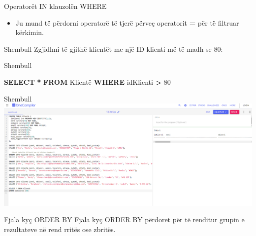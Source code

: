 \documentclass[
  ignorenonframetext,
]{beamer}
\newenvironment{Shaded}{\begin{snugshade}}{\end{snugshade}}
\newcommand{\DecValTok}[1]{\textcolor[rgb]{0.00,0.00,0.81}{#1}}
\newcommand{\KeywordTok}[1]{\textcolor[rgb]{0.13,0.29,0.53}{\textbf{#1}}}
\newcommand{\NormalTok}[1]{#1}
\newcommand{\OperatorTok}[1]{\textcolor[rgb]{0.81,0.36,0.00}{\textbf{#1}}}
\providecommand{\tightlist}{%
  \setlength{\itemsep}{0pt}\setlength{\parskip}{0pt}}
\begin{document}
\begin{frame}{Operatorët IN klauzolën WHERE}
\label{operatoruxebt-in-klauzoluxebn-where}
\begin{itemize}
\tightlist
\item
  Ju mund të përdorni operatorë të tjerë përveç operatorit \textbf{=}
  për të filtruar kërkimin.
\end{itemize}
\end{frame}

\begin{frame}{Shembull}
\label{shembull-5}
Zgjidhni të gjithë klientët me një ID klienti më të madh se 80:
\end{frame}

\begin{frame}[fragile]{Shembull}
\label{shembull-6}
\begin{Shaded}
\begin{Highlighting}[]
\KeywordTok{SELECT} \OperatorTok{*} \KeywordTok{FROM}\NormalTok{ Klientë}
\KeywordTok{WHERE}\NormalTok{ idKlienti }\OperatorTok{\textgreater{}} \DecValTok{80}
\end{Highlighting}
\end{Shaded}
\end{frame}

\begin{frame}{Shembull}
\label{shembull-7}
\includegraphics{./Figs/query8.png}
\end{frame}

\begin{frame}{Fjala kyç ORDER BY}
\label{fjala-kyuxe7-order-by}
Fjala kyç ORDER BY përdoret për të renditur grupin e rezultateve në rend
rritës ose zbritës.
\end{frame}
\end{document}
